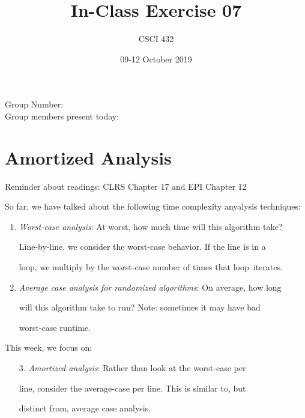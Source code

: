 \documentclass{article}
\title{In-Class Exercise 07}
\author{CSCI 432}
\date{09-12 October 2019}
\begin{document}
\maketitle



\noindent

Group Number:\\

Group members present today:



\section*{Amortized Analysis}



Reminder about readings: CLRS Chapter 17 and EPI Chapter 12



So far, we have talked about the following time complexity anyalysis techniques:

\begin{enumerate}

    \item \emph{Worst-case analysis}: At worst, how much time will this algorithm take?

        Line-by-line, we consider the worst-case behavior.  If the line is in a

        loop, we multiply by the worst-case number of times that loop~iterates.

    \item \emph{Average case analysis for randomized algorithms}: On average, how long

        will this algorithm take to run?  Note: sometimes it may have bad

        worst-case runtime.

\end{enumerate}

This week, we focus on:

\begin{enumerate}

    \item[3.] \emph{Amortized analysis}: Rather than look at the worst-case per

        line, consider the average-case per line.  This is similar to, but

        distinct from, average case analysis.

\end{enumerate}
\end{document}
